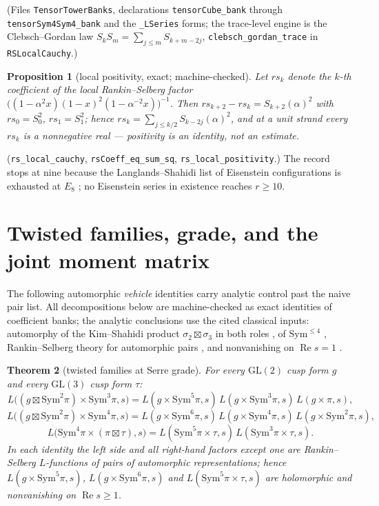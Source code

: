 \documentclass[11pt]{article}
\newtheorem{theorem}{Theorem}[section]
\newtheorem{proposition}[theorem]{Proposition}
\theoremstyle{definition}
\theoremstyle{remark}
\newcommand{\Sym}{\mathrm{Sym}}
\newcommand{\GL}{\mathrm{GL}}
\renewcommand{\Re}{\operatorname{Re}}
\begin{document}
(Files \texttt{TensorTowerBanks}, declarations \texttt{tensorCube\_bank}
through \texttt{tensorSym4Sym4\_bank} and the \texttt{\_LSeries} forms;
the trace-level engine is the Clebsch--Gordan law
$S_k S_m=\sum_{j\le m}S_{k+m-2j}$, \texttt{clebsch\_gordan\_trace} in
\texttt{RSLocalCauchy}.)

\begin{proposition}[local positivity, exact; machine-checked]
\label{prop:sumsq}
Let $rs_k$ denote the $k$-th coefficient of the local Rankin--Selberg factor
$\bigl((1-\alpha^2x)(1-x)^2(1-\alpha^{-2}x)\bigr)^{-1}$.  Then
$rs_{k+2}-rs_k=S_{k+2}(\alpha)^2$ with $rs_0=S_0^2$, $rs_1=S_1^2$; hence
$rs_k=\sum_{j\le k/2}S_{k-2j}(\alpha)^2$, and at a unit strand every $rs_k$
is a nonnegative real --- positivity is an identity, not an estimate.
\end{proposition}

(\texttt{rs\_local\_cauchy}, \texttt{rsCoeff\_eq\_sum\_sq},
\texttt{rs\_local\_positivity}.)  The record stops at nine because the
Langlands--Shahidi list of Eisenstein configurations is exhausted at $E_8$
\cite{KimShahidiIMRN}; no Eisenstein series in existence reaches $r\ge 10$.

\section{Twisted families, grade, and the joint moment matrix}
\label{sec:joint}

The following automorphic \emph{vehicle} identities carry analytic control
past the naive pair list.  All decompositions below are machine-checked as
exact identities of coefficient banks; the analytic conclusions use the cited
classical inputs: automorphy of the Kim--Shahidi product $\sigma_2\boxtimes
\sigma_3$ in both roles \cite{KimShahidiAnnals}, of $\Sym^{\le4}$
\cite{GJ,KimShahidiAnnals,KimJAMS}, Rankin--Selberg theory for automorphic
pairs \cite{JPSS}, and nonvanishing on $\Re s=1$ \cite{ShahidiNonvanishing}.

\begin{theorem}[twisted families at Serre grade]\label{thm:twisted}
For every $\GL(2)$ cusp form $g$ and every $\GL(3)$ cusp form $\tau$:
\[
L\bigl((g\boxtimes\Sym^2\pi)\times\Sym^3\pi,s\bigr)
 = L(g\times\Sym^5\pi,s)\,L(g\times\Sym^3\pi,s)\,L(g\times\pi,s),
\]
\[
L\bigl((g\boxtimes\Sym^2\pi)\times\Sym^4\pi,s\bigr)
 = L(g\times\Sym^6\pi,s)\,L(g\times\Sym^4\pi,s)\,L(g\times\Sym^2\pi,s),
\]
\[
L\bigl(\Sym^4\pi\times(\pi\boxtimes\tau),s\bigr)
 = L(\Sym^5\pi\times\tau,s)\,L(\Sym^3\pi\times\tau,s).
\]
In each identity the left side and all right-hand factors except one are
Rankin--Selberg $L$-functions of pairs of automorphic representations; hence
$L(g\times\Sym^5\pi,s)$, $L(g\times\Sym^6\pi,s)$ and
$L(\Sym^5\pi\times\tau,s)$ are holomorphic and nonvanishing on
$\Re s\ge 1$.
\end{theorem}
\end{document}
